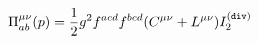 \begin{equation}
\label{gvpt}
\Pi^{\mu\nu}_{ab}(p)=\frac{1}{2}g^2 f^{acd}f^{bcd}(C^{\mu\nu}+L^{\mu\nu})I_2^{(\tt div)}
\end{equation}

